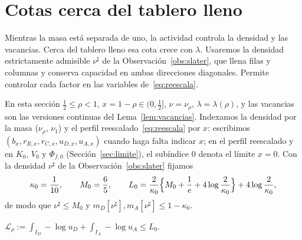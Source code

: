 \section{Cotas cerca del tablero lleno}\label{sec:cotas}

Mientras la masa está separada de uno, la actividad controla la densidad y las vacancias.
Cerca del tablero lleno esa cota crece con $\lambda$. Usaremos la densidad estrictamente admisible $\nu^\sharp$
de la Observación~\ref{obs:slater}, que llena filas y columnas y conserva capacidad en ambas
direcciones diagonales. Permite controlar cada factor en las variables de~\eqref{eq:reescala}.

En esta sección $\frac12\le\rho<1$, $x=1-\rho\in(0,\frac12]$, $\nu=\nu_\rho$, $\lambda=\lambda(\rho)$,
y las vacancias son las versiones continuas del Lema~\ref{lem:vacancias}. Indexamos la densidad por
la masa ($\nu_\rho$, $\nu_1$) y el perfil reescalado~\eqref{eq:reescala} por $x$: escribimos
$(b_x,r_{R,x},r_{C,x},u_{D,x},u_{A,x})$ cuando haga falta indicar $x$; en el perfil reescalado y en $K_0$, $V_0$ y
$\Phi_{f,0}$ (Sección~\ref{sec:limite}), el subíndice $0$ denota el límite $x=0$. Con la densidad $\nu^\sharp$ de la Observación~\ref{obs:slater} fijamos
\[
 \kappa_0=\frac1{10},\qquad M_0=\frac65,\qquad
 L_0=\frac2{\kappa_0}\Bigl\{M_0+\frac1e+4\log\frac2{\kappa_0}\Bigr\}+4\log\frac2{\kappa_0},
\]
de modo que $\nu^\sharp\le M_0$ y $m_D[\nu^\sharp],m_A[\nu^\sharp]\le1-\kappa_0$.

\begin{lema}\label{lem:log_diag}
$\displaystyle \mathcal L_\rho:=\int_{I_D}-\log u_D+\int_{I_A}-\log u_A\le L_0$.
\end{lema}

